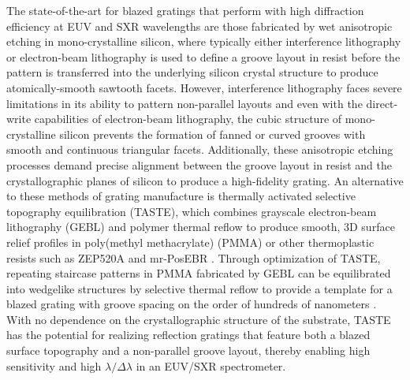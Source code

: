 \documentclass{aastex63}
\begin{document}
The state-of-the-art for blazed gratings that perform with high diffraction efficiency at EUV and SXR wavelengths are those fabricated by wet anisotropic etching in mono-crystalline silicon, where typically either interference lithography \citep{Franke97,Chang03} or electron-beam lithography \citep{Voronov11,Miles18} is used to define a groove layout in resist before the pattern is transferred into the underlying silicon crystal structure to produce atomically-smooth sawtooth facets. 
However, interference lithography faces severe limitations in its ability to pattern non-parallel layouts and even with the direct-write capabilities of electron-beam lithography, the cubic structure of mono-crystalline silicon prevents the formation of fanned or curved grooves with smooth and continuous triangular facets. 
Additionally, these anisotropic etching processes demand precise alignment between the groove layout in resist and the crystallographic planes of silicon to produce a high-fidelity grating. 
An alternative to these methods of grating manufacture is thermally activated selective topography equilibration (TASTE), which combines grayscale electron-beam lithography (GEBL) and polymer thermal reflow to produce smooth, 3D surface relief profiles in poly(methyl methacrylate) (PMMA) or other thermoplastic resists such as ZEP520A and mr-PosEBR \citep{Schleunitz14,Kirchner16,Pfirrmann16}. 
Through optimization of TASTE, repeating staircase patterns in PMMA fabricated by GEBL can be equilibrated into wedgelike structures by selective thermal reflow to provide a template for a blazed grating with groove spacing on the order of hundreds of nanometers \citep{McCoy18}. 
With no dependence on the crystallographic structure of the substrate, TASTE has the potential for realizing reflection gratings that feature both a blazed surface topography and a non-parallel groove layout, thereby enabling high sensitivity and high $\lambda / \Delta \lambda$ in an EUV/SXR spectrometer.  
\end{document}
